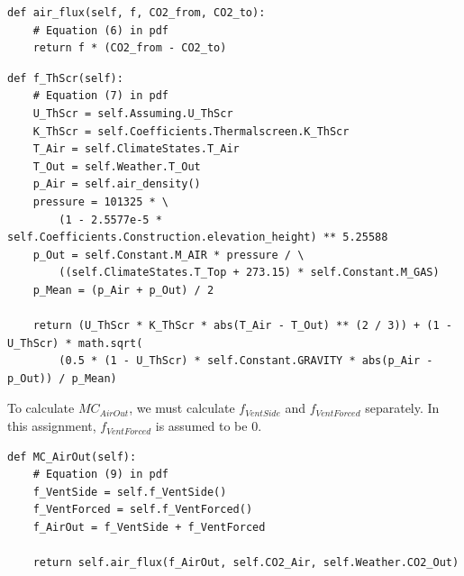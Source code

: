 \documentclass[a4paper]{article}
\begin{document}
\begin{mdframed}[leftline=false,rightline=false,backgroundcolor=magenta!10,nobreak=true]
  \begin{verbatim}
def air_flux(self, f, CO2_from, CO2_to):
    # Equation (6) in pdf
    return f * (CO2_from - CO2_to)
  \end{verbatim}
\end{mdframed}

\begin{mdframed}[leftline=false,rightline=false,backgroundcolor=magenta!10,nobreak=true]
  \begin{verbatim}
def f_ThScr(self):
    # Equation (7) in pdf
    U_ThScr = self.Assuming.U_ThScr
    K_ThScr = self.Coefficients.Thermalscreen.K_ThScr
    T_Air = self.ClimateStates.T_Air
    T_Out = self.Weather.T_Out
    p_Air = self.air_density()
    pressure = 101325 * \
        (1 - 2.5577e-5 * self.Coefficients.Construction.elevation_height) ** 5.25588
    p_Out = self.Constant.M_AIR * pressure / \
        ((self.ClimateStates.T_Top + 273.15) * self.Constant.M_GAS)
    p_Mean = (p_Air + p_Out) / 2

    return (U_ThScr * K_ThScr * abs(T_Air - T_Out) ** (2 / 3)) + (1 - U_ThScr) * math.sqrt(
        (0.5 * (1 - U_ThScr) * self.Constant.GRAVITY * abs(p_Air - p_Out)) / p_Mean)
  \end{verbatim}
\end{mdframed}

To calculate \(MC_{AirOut}\), we must calculate \(f_{VentSide}\) and \(f_{VentForced}\) separately.
In this assignment, \(f_{VentForced}\) is assumed to be 0.

\begin{mdframed}[leftline=false,rightline=false,backgroundcolor=magenta!10,nobreak=true]
  \begin{verbatim}
def MC_AirOut(self):
    # Equation (9) in pdf
    f_VentSide = self.f_VentSide()
    f_VentForced = self.f_VentForced()
    f_AirOut = f_VentSide + f_VentForced

    return self.air_flux(f_AirOut, self.CO2_Air, self.Weather.CO2_Out)
  \end{verbatim}
\end{mdframed}
\end{document}
